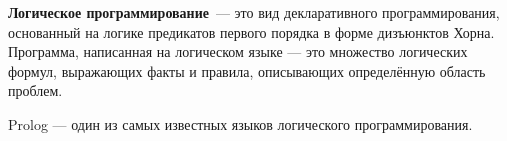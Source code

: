 {\bf Логическое программирование}~--- это вид декларативного программирования,
основанный на логике предикатов первого порядка в форме дизъюнктов Хорна.\cite{logicMJ}
Программа, написанная на логическом языке --- это множество логических формул,
выражающих факты и правила, описывающих определённую область проблем.

Prolog --- один из самых известных языков логического программирования.


% 
% 
% 
% 
